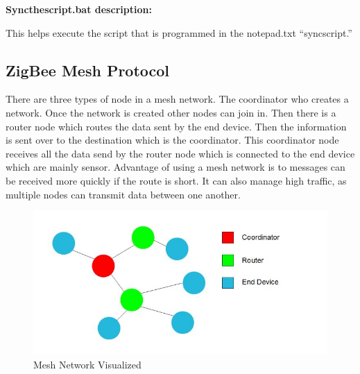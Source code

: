 		\noindent\textbf{ Syncthescript.bat description:}
		\par This helps execute the script that is programmed in the notepad.txt “syncscript.”\\
		
		
	
\subsection{ZigBee Mesh Protocol}
	\par There are three types of node in a mesh network. The coordinator who creates a network. Once the network is created other nodes can join in. Then there is a router node which routes the data sent by the end device. Then the information is sent over to the destination which is the coordinator. This coordinator node receives all the data send by the router node which is connected to the end device which are mainly sensor. Advantage of using a mesh network is to messages can be received more quickly if the route is short. It can also manage high traffic, as multiple nodes can transmit data between one another. 
	\begin{figure}
		\centering
		\includegraphics[width=0.5\linewidth]{mesh.jpg}
		\caption{Mesh Network Visualized}
		\label{fig:mesh}
	\end{figure}
